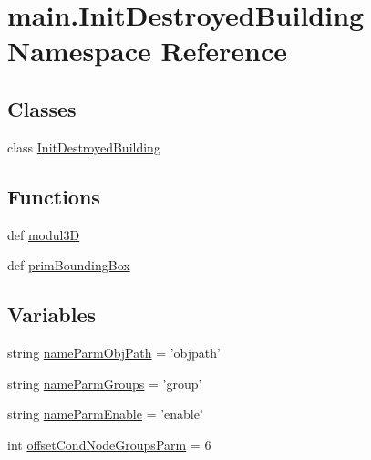 \hypertarget{namespacemain_1_1_init_destroyed_building}{\section{main.\-Init\-Destroyed\-Building Namespace Reference}
\label{namespacemain_1_1_init_destroyed_building}
}
\subsection*{Classes}
\begin{DoxyCompactItemize}
\item 
class \hyperlink{classmain_1_1_init_destroyed_building_1_1_init_destroyed_building}{Init\-Destroyed\-Building}
\end{DoxyCompactItemize}
\subsection*{Functions}
\begin{DoxyCompactItemize}
\item 
def \hyperlink{namespacemain_1_1_init_destroyed_building_ada867b5c5775c60ebca7e4490acc6b25}{modul3\-D}
\item 
def \hyperlink{namespacemain_1_1_init_destroyed_building_a0bd3a54a6a9fa65a859dd82e9d7410aa}{prim\-Bounding\-Box}
\end{DoxyCompactItemize}
\subsection*{Variables}
\begin{DoxyCompactItemize}
\item 
string \hyperlink{namespacemain_1_1_init_destroyed_building_abdfde9f8b443891807aa36e2ac0902df}{name\-Parm\-Obj\-Path} = 'objpath'
\item 
string \hyperlink{namespacemain_1_1_init_destroyed_building_a153234f6c1239470d872c73878045631}{name\-Parm\-Groups} = 'group'
\item 
string \hyperlink{namespacemain_1_1_init_destroyed_building_ab3ccb4486ca5070b11f9df5fbd4d1698}{name\-Parm\-Enable} = 'enable'
\item 
int \hyperlink{namespacemain_1_1_init_destroyed_building_a483d1635fc631db9b1278145032d0955}{offset\-Cond\-Node\-Groups\-Parm} = 6
\end{DoxyCompactItemize}


